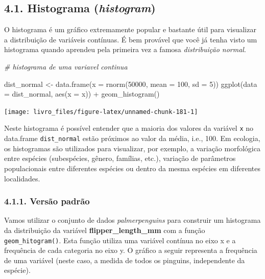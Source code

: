 \documentclass[
]{book}
\newenvironment{Shaded}{\begin{snugshade}}{\end{snugshade}}
\newcommand{\AttributeTok}[1]{\textcolor[rgb]{0.61,0.61,0.61}{#1}}
\newcommand{\CommentTok}[1]{\textcolor[rgb]{0.37,0.37,0.37}{\textit{#1}}}
\newcommand{\DecValTok}[1]{\textcolor[rgb]{0.06,0.06,0.06}{#1}}
\newcommand{\FunctionTok}[1]{\textcolor[rgb]{0,0,0}{#1}}
\newcommand{\NormalTok}[1]{#1}
\newcommand{\OtherTok}[1]{\textcolor[rgb]{0.37,0.37,0.37}{#1}}
\newcommand{\SpecialCharTok}[1]{\textcolor[rgb]{0,0,0}{#1}}
\begin{document}
\hypertarget{histograma-histogram}{%
\subsection{\texorpdfstring{4.1. Histograma (\emph{histogram})}{4.1. Histograma (histogram)}}\label{histograma-histogram}}

O histograma é um gráfico extremamente popular e bastante útil para visualizar a distribuição de variáveis contínuas. É bem provável que você já tenha visto um histograma quando aprendeu pela primeira vez a famosa \emph{distribuição normal}.

\begin{Shaded}
\begin{Highlighting}[]
\CommentTok{\# histograma de uma variavel continua}

\NormalTok{dist\_normal }\OtherTok{\textless{}{-}} \FunctionTok{data.frame}\NormalTok{(}\AttributeTok{x =} \FunctionTok{rnorm}\NormalTok{(}\DecValTok{50000}\NormalTok{, }\AttributeTok{mean =} \DecValTok{100}\NormalTok{, }\AttributeTok{sd =} \DecValTok{5}\NormalTok{))}
\FunctionTok{ggplot}\NormalTok{(}\AttributeTok{data =}\NormalTok{ dist\_normal, }
       \FunctionTok{aes}\NormalTok{(}\AttributeTok{x =}\NormalTok{ x)) }\SpecialCharTok{+}
  \FunctionTok{geom\_histogram}\NormalTok{()}
\end{Highlighting}
\end{Shaded}

\begin{center}\texttt{[image: livro\_files/figure-latex/unnamed-chunk-181-1]} \end{center}

Neste histograma é possível entender que a maioria dos valores da variável \texttt{x} no data.frame \texttt{dist\_normal} estão próximos ao valor da média, i.e., 100. Em ecologia, os histogramas são utilizados para visualizar, por exemplo, a variação morfológica entre espécies (subespécies, gênero, famílias, etc.), variação de parâmetros populacionais entre diferentes espécies ou dentro da mesma espécies em diferentes localidades.

\hypertarget{versuxe3o-padruxe3o}{%
\subsubsection{4.1.1. Versão padrão}\label{versuxe3o-padruxe3o}}

Vamos utilizar o conjunto de dados \emph{palmerpenguins} para construir um histograma da distribuição da variável \textbf{flipper\_length\_mm} com a função \texttt{geom\_hitogram()}. Esta função utiliza uma variável contínua no eixo x e a frequência de cada categoria no eixo y. O gráfico a seguir representa a frequência de uma variável (neste caso, a medida de todos os pinguins, independente da espécie).
\end{document}
